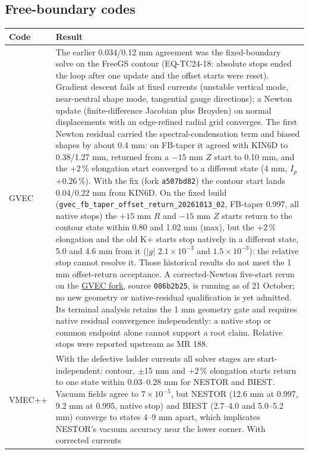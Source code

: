 \subsection*{Free-boundary codes}
\begin{center}\small
\begin{tabular}{p{18mm}p{136mm}}
\toprule
Code & Result \\
\midrule
GVEC & The earlier 0.034/0.12 mm agreement was the fixed-boundary solve on the FreeGS contour
(EQ-TC24-18: absolute stops ended the loop after one update and the offset starts were reset).
Gradient descent fails at fixed currents (unstable vertical mode, near-neutral shape mode,
tangential gauge directions); a Newton update (finite-difference Jacobian plus Broyden) on
normal displacements with an edge-refined radial grid converges. The first Newton residual
carried the spectral-condensation term and biased shapes by about 0.4 mm: on FB-taper it
agreed with KIN6D to 0.38/1.27 mm, returned from a $-15$ mm $Z$ start to 0.10 mm, and the
$+2$\,\% elongation start converged to a different state (4 mm, $I_p$ $+0.26$\,\%). With
the fix (fork \texttt{a507bd82}) the contour start lands 0.04/0.22 mm from KIN6D. On the
fixed build (\texttt{gvec\_fb\_taper\_offset\_return\_20261013\_02}, FB-taper 0.997, all native
stops) the $+15$ mm $R$ and $-15$ mm $Z$ starts return to the contour state within 0.80 and
1.02 mm (max), but the $+2$\,\% elongation and the old K+ starts stop natively in a different
state, 5.0 and 4.6 mm from it ($|g|$ $2.1\times10^{-3}$ and $1.5\times10^{-3}$): the
relative stop cannot resolve it. Those historical results do not meet the 1 mm
offset-return acceptance. A corrected-Newton five-start rerun on the
\href{https://github.com/itpplasma/gvec}{GVEC fork}, source \texttt{086b2b25}, is
running as of 21 October; no new geometry or native-residual qualification is yet
admitted. Its terminal analysis retains the 1 mm geometry gate and requires native
residual convergence independently: a native stop or common endpoint alone cannot
support a root claim. Relative stops were reported upstream as MR 188. \\
VMEC++ & With the defective ladder currents all solver stages are start-independent: contour,
$\pm15$ mm and $+2$\,\% elongation starts return to one state within 0.03--0.28 mm for NESTOR
and BIEST. Vacuum fields agree to $7\times10^{-5}$, but NESTOR (12.6 mm at 0.997, 9.2 mm at
0.995, native stop) and BIEST (2.7--4.0 and 5.0--5.2 mm) converge to states 4--9 mm apart,
which implicates NESTOR's vacuum accuracy near the lower corner. With corrected currents

\end{tabular}
\end{center}
